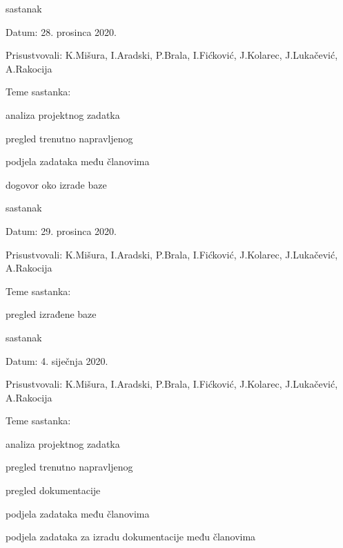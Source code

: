 \begin{packed_enum}
			\item  sastanak
			\item[] \begin{packed_item}
				\item Datum: 28. prosinca 2020.
				\item Prisustvovali:  K.Mišura, I.Aradski, P.Brala, I.Fićković, J.Kolarec, J.Lukačević, A.Rakocija
				\item Teme sastanka:
				\begin{packed_item}
					\item  analiza projektnog zadatka 
					\item  pregled trenutno napravljenog
					\item  podjela zadataka među članovima
					\item  dogovor oko izrade baze
				\end{packed_item}
			\end{packed_item}
			
			\item  sastanak
			\item[] \begin{packed_item}
				\item Datum: 29. prosinca 2020.
				\item Prisustvovali:  K.Mišura, I.Aradski, P.Brala, I.Fićković, J.Kolarec, J.Lukačević, A.Rakocija
				\item Teme sastanka:
				\begin{packed_item}
					\item  pregled izrađene baze
				\end{packed_item}
			\end{packed_item}
			
			\item  sastanak
			\item[] \begin{packed_item}
				\item Datum: 4. siječnja 2020.
				\item Prisustvovali:  K.Mišura, I.Aradski, P.Brala, I.Fićković, J.Kolarec, J.Lukačević, A.Rakocija
				\item Teme sastanka:
				\begin{packed_item}
					\item  analiza projektnog zadatka 
					\item  pregled trenutno napravljenog
					\item  pregled dokumentacije
					\item  podjela zadataka među članovima
					\item  podjela zadataka za izradu dokumentacije među članovima 
				\end{packed_item}
			\end{packed_item}
			

\end{packed_enum}
